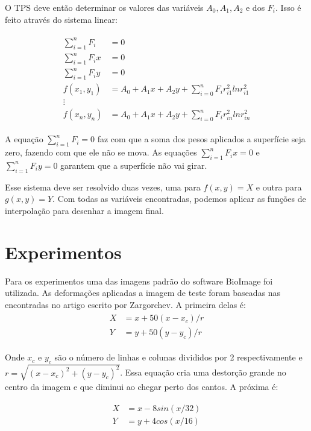 \documentclass[]{spie}  %
\begin{document}
	O TPS deve então determinar os valores das variáveis $A_0, A_1, A_2$ e dos $F_i$. 
Isso é feito através do sistema linear:

\begin{align}
\begin{split}
	\sum_{i=1}^n F_i &= 0 \\
	\sum_{i=1}^n F_ix &= 0 \\
	\sum_{i=1}^n F_iy &= 0 \\
	f(x_1,y_1) &= A_0 + A_1x + A_2y + \sum_{i=0}^n F_i r_{i1}^2 ln r_{i1}^2 \\
	\vdots \\
	f(x_n,y_n) &= A_0 + A_1x + A_2y + \sum_{i=0}^n F_i r_{in}^2 ln r_{in}^2
\end{split}
\end{align}

A equação $\sum_{i=1}^n F_i = 0$ faz com que a soma dos pesos aplicados a superfície seja zero, fazendo com que
ele não se mova. As equações $\sum_{i=1}^n F_ix = 0$ e $\sum_{i=1}^n F_iy = 0$ garantem que a superfície não vai girar.

	Esse sistema deve ser resolvido duas vezes, uma para $f(x,y) = X$ e outra para $g(x,y) = Y$. Com todas as variáveis
encontradas, podemos aplicar as funções de interpolação para desenhar a imagem final.

\section{Experimentos}
	Para os experimentos uma das imagens padrão do software BioImage\cite{papademetris2005bioimage} foi utilizada.
As deformações aplicadas a imagem de teste foram baseadas nas encontradas no artigo escrito por 
Zargorchev\cite{zagorchev2006comparative}. A primeira delas é:
\begin{align}
\begin{split}
	X &= x + 50(x-x_c)/r \\
	Y &= y + 50(y-y_c)/r 
\end{split} 
\end{align}

Onde $x_c$ e $y_c$ são o número de linhas e colunas divididos por 2 respectivamente e $r = \sqrt{(x-x_c)^2 + (y-y_c)^2}$.
Essa equação cria uma destorção grande no centro da imagem e que diminui ao chegar perto dos cantos. A próxima é:

\begin{align}
\begin{split}
	X &= x - 8sin(x/32) \\
	Y &= y + 4cos(x/16)
\end{split}  	
\end{align}
\end{document}
